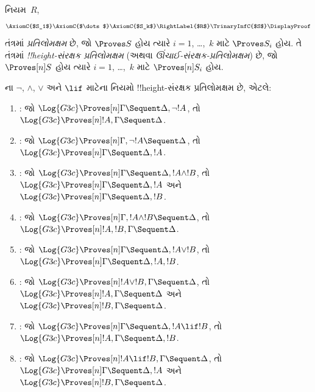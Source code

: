 \documentclass[../../../include/open-logic-section]{subfiles}
\begin{document}


\begin{defn}
નિયમ~$R$,
\[
\AxiomC{$S_1$}
\AxiomC{$\dots$}
\AxiomC{$S_k$}
\RightLabel{$R$}
\TrinaryInfC{$S$}
\DisplayProof
\]
તંત્રમાં \emph{પ્રતિલોમક્ષમ} છે,
જો $\Proves S$ હોય ત્યારે
$i = 1$, \dots,~$k$ માટે $\Proves S_i$ હોય.
તે તંત્રમાં \emph{!!{height}-સંરક્ષક પ્રતિલોમક્ષમ}
(અથવા \emph{ઊંચાઈ-સંરક્ષક-પ્રતિલોમક્ષમ}) છે,
જો $\Proves[n] S$ હોય ત્યારે $i = 1$, \dots,~$k$ માટે
$\Proves[n] S_i$ હોય.
\end{defn}

\begin{lem}
ના $\lnot$, $\land$, $\lor$ અને $\lif$ માટેના નિયમો
!!{height}-સંરક્ષક પ્રતિલોમક્ષમ છે, એટલે:
\begin{enumerate}
  \item \RightR{\lnot}: જો $\Log{G3c} \Proves[n] \Gamma \Sequent
  \Delta, \lnot !A$, તો $\Log{G3c} \Proves[n] !A, \Gamma \Sequent
  \Delta$.
  \item \LeftR{\lnot}: જો $\Log{G3c} \Proves[n] \Gamma, \lnot !A
  \Sequent \Delta$, તો $\Log{G3c} \Proves[n] \Gamma \Sequent \Delta,
  !A$.
  \item \RightR{\land}: જો $\Log{G3c} \Proves[n] \Gamma \Sequent
  \Delta, !A \land !B$, તો $\Log{G3c} \Proves[n] \Gamma \Sequent
  \Delta, !A$ અને $\Log{G3c} \Proves[n] \Gamma \Sequent
  \Delta, !B$.
  \item \LeftR{\land}: જો $\Log{G3c} \Proves[n] \Gamma, !A \land !B
  \Sequent \Delta$, તો $\Log{G3c} \Proves[n] !A, !B, \Gamma \Sequent
  \Delta$.
  \item \RightR{\lor}: જો $\Log{G3c} \Proves[n] \Gamma \Sequent
  \Delta, !A \lor !B$, તો $\Log{G3c} \Proves[n] \Gamma \Sequent
  \Delta, !A, !B$.
  \item \LeftR{\lor}: જો $\Log{G3c} \Proves[n] !A \lor !B, \Gamma \Sequent
  \Delta$, તો $\Log{G3c} \Proves[n] !A, \Gamma \Sequent
  \Delta$ અને $\Log{G3c} \Proves[n] !B, \Gamma \Sequent
  \Delta$.
  \item \RightR{\lif}: જો $\Log{G3c} \Proves[n] \Gamma \Sequent
  \Delta, !A \lif !B$, તો $\Log{G3c} \Proves[n] !A, \Gamma \Sequent
  \Delta, !B$.
  \item \LeftR{\lif}: જો $\Log{G3c} \Proves[n] !A \lif !B, \Gamma
  \Sequent \Delta$, તો $\Log{G3c} \Proves[n] \Gamma \Sequent \Delta,
  !A$ અને $\Log{G3c} \Proves[n] !B, \Gamma \Sequent \Delta$.
\end{enumerate}
\end{lem}
\end{document}
